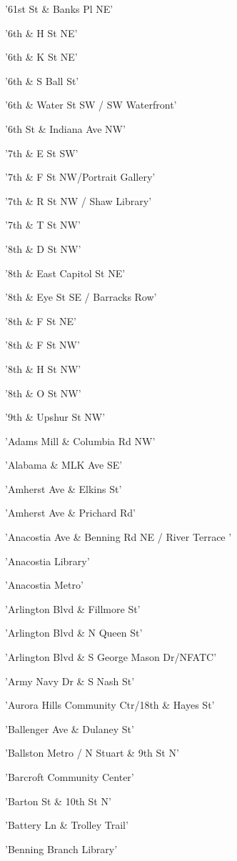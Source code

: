 \documentclass[11pt]{article}
\begin{document}
\begin{enumerate*}
\item '61st St \& Banks Pl NE'
\item '6th \& H St NE'
\item '6th \& K St NE'
\item '6th \& S Ball St'
\item '6th \& Water St SW / SW Waterfront'
\item '6th St \& Indiana Ave NW'
\item '7th \& E St SW'
\item '7th \& F St NW/Portrait Gallery'
\item '7th \& R St NW / Shaw Library'
\item '7th \& T St NW'
\item '8th \& D St NW'
\item '8th \& East Capitol St NE'
\item '8th \& Eye St SE / Barracks Row'
\item '8th \& F St NE'
\item '8th \& F St NW'
\item '8th \& H St NW'
\item '8th \& O St NW'
\item '9th \& Upshur St NW'
\item 'Adams Mill \& Columbia Rd NW'
\item 'Alabama \& MLK Ave SE'
\item 'Amherst Ave \& Elkins St'
\item 'Amherst Ave \& Prichard Rd'
\item 'Anacostia Ave \& Benning Rd NE / River Terrace '
\item 'Anacostia Library'
\item 'Anacostia Metro'
\item 'Arlington Blvd \& Fillmore St'
\item 'Arlington Blvd \& N Queen St'
\item 'Arlington Blvd \& S George Mason Dr/NFATC'
\item 'Army Navy Dr \& S Nash St'
\item 'Aurora Hills Community Ctr/18th \& Hayes St'
\item 'Ballenger Ave \& Dulaney St'
\item 'Ballston Metro / N Stuart \& 9th St N'
\item 'Barcroft Community Center'
\item 'Barton St \& 10th St N'
\item 'Battery Ln \& Trolley Trail'
\item 'Benning Branch Library'

\end{enumerate*}
\end{document}
